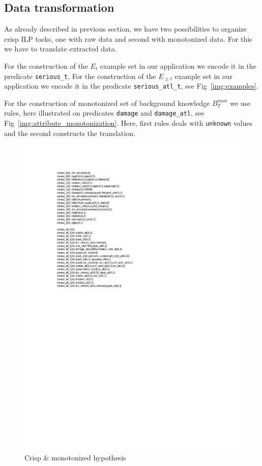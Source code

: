 \documentclass[authoryear,12pt]{elsarticle}
\begin{document}
\subsection{Data transformation} \label{sec:data_transformation}

As already described in previous section, we have two possibilities to organize crisp ILP tasks, one with raw data and second with monotonized data. For this we have to translate extracted data. 

For the construction of the $E_t$ example set in our application we encode it in the predicate \texttt{serious\_t}, For the construction of the $E_{\ge t}$ example set in our application we encode it in the predicate \texttt{serious\_atl\_t}, see Fig~\ref{img:examples}.





%
%
For the construction of monotonized set of background knowledge $B^{mon}_T$ we use rules, here illustrated on predicates \texttt{damage} and \texttt{damage\_atl}, see Fig~\ref{img:attribute_monotonization}. Here, first rules deals with \texttt{unknown} values and the second constructs the translation.


\begin{figure}
\centerline{\includegraphics[width=0.6\hsize,height=0.65\hsize]{img/rules}}
\caption{Crisp \& monotonized hypothesis}
\label{img:rules}
\end{figure}
\end{document}
